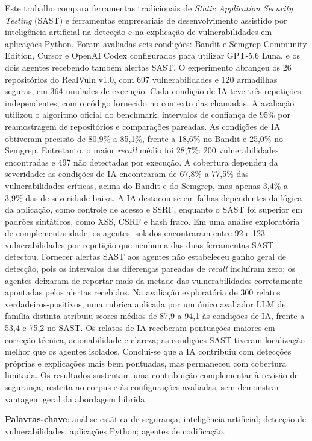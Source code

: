 
\setlength{\absparsep}{18pt} %
\begin{resumo}

Este trabalho compara ferramentas tradicionais de \textit{Static Application Security Testing} (SAST) e ferramentas empresariais de desenvolvimento assistido por inteligência artificial na detecção e na explicação de vulnerabilidades em aplicações Python. Foram avaliadas seis condições: Bandit e Semgrep Community Edition, Cursor e OpenAI Codex configurados para utilizar GPT-5.6 Luna, e os dois agentes recebendo também alertas SAST. O experimento abrangeu os 26 repositórios do RealVuln v1.0, com 697 vulnerabilidades e 120 armadilhas seguras, em 364 unidades de execução. Cada condição de IA teve três repetições independentes, com o código fornecido no contexto das chamadas. A avaliação utilizou o algoritmo oficial do benchmark, intervalos de confiança de 95\% por reamostragem de repositórios e comparações pareadas. As condições de IA obtiveram precisão de 80,9\% a 85,1\%, frente a 18,6\% no Bandit e 25,0\% no Semgrep. Entretanto, o maior \textit{recall} médio foi 28,7\%: 200 vulnerabilidades encontradas e 497 não detectadas por execução. A cobertura dependeu da severidade: as condições de IA encontraram de 67,8\% a 77,5\% das vulnerabilidades críticas, acima do Bandit e do Semgrep, mas apenas 3,4\% a 3,9\% das de severidade baixa. A IA destacou-se em falhas dependentes da lógica da aplicação, como controle de acesso e SSRF, enquanto o SAST foi superior em padrões sintáticos, como XSS, CSRF e hash fraco. Em uma análise exploratória de complementaridade, os agentes isolados encontraram entre 92 e 123 vulnerabilidades por repetição que nenhuma das duas ferramentas SAST detectou. Fornecer alertas SAST aos agentes não estabeleceu ganho geral de detecção, pois os intervalos das diferenças pareadas de \textit{recall} incluíram zero; os agentes deixaram de reportar mais da metade das vulnerabilidades corretamente apontadas pelos alertas recebidos. Na avaliação exploratória de 300 relatos verdadeiros-positivos, uma rubrica aplicada por um único avaliador LLM de família distinta atribuiu scores médios de 87,9 a 94,1 às condições de IA, frente a 53,4 e 75,2 no SAST. Os relatos de IA receberam pontuações maiores em correção técnica, acionabilidade e clareza; as condições SAST tiveram localização melhor que os agentes isolados. Conclui-se que a IA contribuiu com detecções próprias e explicações mais bem pontuadas, mas permaneceu com cobertura limitada. Os resultados sustentam uma contribuição complementar à revisão de segurança, restrita ao corpus e às configurações avaliadas, sem demonstrar vantagem geral da abordagem híbrida.

 \textbf{Palavras-chave}: análise estática de segurança; inteligência artificial; detecção de vulnerabilidades; aplicações Python; agentes de codificação.
\end{resumo}

